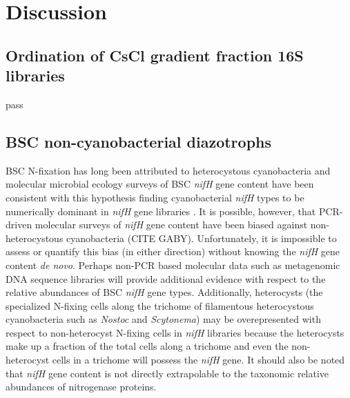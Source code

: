 \section{Discussion}

\subsection{Ordination of CsCl gradient fraction 16S libraries}
pass

\subsection{BSC non-cyanobacterial diazotrophs}
BSC N-fixation has long been attributed to heterocystous cyanobacteria and molecular microbial ecology surveys of BSC \textit{nifH} gene content have been consistent with this hypothesis finding cyanobacterial \textit{nifH} types to be numerically dominant in \textit{nifH} gene libraries \cite{Yeager,14766579,Yeager_2012}. It is possible, however, that PCR-driven molecular surveys of \textit{nifH} gene content have been biased against non-heterocystous cyanobacteria (CITE GABY). Unfortunately, it is impossible to assess or quantify this bias (in either direction) without knowing the \textit{nifH} gene content \textit{de novo}. Perhaps non-PCR based molecular data such as metagenomic DNA sequence libraries will provide additional evidence with respect to the relative abundances of BSC \textit{nifH} gene types. Additionally, heterocysts (the specialized N-fixing cells along the trichome of filamentous heterocystous cyanobacteria such as \textit{Nostoc} and \textit{Scytonema}) may be overepresented with respect to non-heterocyst N-fixing cells in \textit{nifH} libraries because the heterocysts make up a fraction of the total cells along a trichome and even the non-heterocyst cells in a trichome will possess the \textit{nifH} gene. It should also be noted that \textit{nifH} gene content is not directly extrapolable to the taxonomic relative abundances of nitrogenase proteins.

